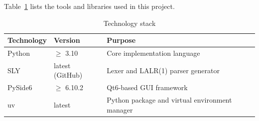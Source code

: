Table~\ref{table:tech_stack} lists the tools and libraries used in this project.

\begin{table}[H]
\centering
\caption{Technology stack}
\label{table:tech_stack}
\begin{tabular}{@{}lll@{}}
\toprule
Technology & Version & Purpose \\
\midrule
Python       & $\geq$ 3.10 & Core implementation language \\
SLY~\citep{beazley2023sly} & latest (GitHub) & Lexer and LALR(1) parser generator \\
PySide6~\citep{qtforpython2024}      & $\geq$ 6.10.2 & Qt6-based GUI framework \\
uv~\citep{astral2024uv}           & latest & Python package and virtual environment manager \\
\bottomrule
\end{tabular}
\end{table}
